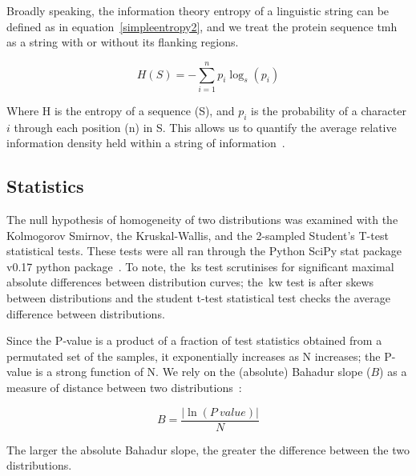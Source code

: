 Broadly speaking, the information theory entropy of a linguistic string can be defined as in equation~\ref{simpleentropy2}, and we treat the protein sequence \gls{tmh} as a string with or without its flanking regions.

\begin{equation} \label{simpleentropy2}
	H(S)=-{\sum_{i=1}^n {p_i\log_s(p_i)}}
\end{equation}

Where H is the entropy of a sequence (S), and $p_i$ is the probability of a character $i$ through each position (n) in S. This allows us to quantify the average relative information density held within a string of information~\cite{Shannon1948}.

\subsection{Statistics}

The null hypothesis of homogeneity of two distributions was examined with the Kolmogorov Smirnov, the Kruskal-Wallis, and the 2-sampled Student's T-test statistical tests.
These tests were all ran through the Python SciPy stat package v0.17 python package~\cite{VanderWalt2011}.
To note, the~\gls{ks} test scrutinises for significant maximal absolute differences between distribution curves; the~\gls{kw} test is after skews between distributions and the student t-test statistical test checks the average difference between distributions.

Since the P‑value is a product of a fraction of test statistics obtained from a permutated set of the samples, it exponentially increases as N increases; the P-value is a strong function of N.
We rely on the (absolute) Bahadur slope ($B$) as a measure of distance between two distributions~\cite{Bahadur1967, Bahadur1971, Sunyaev1998, Baker2017}:

\begin{equation} \label{eq:bahadur2}
B=\frac{|\ln(P~value)|}{N}
\end{equation}

The larger the absolute Bahadur slope, the greater the difference between the two distributions.
